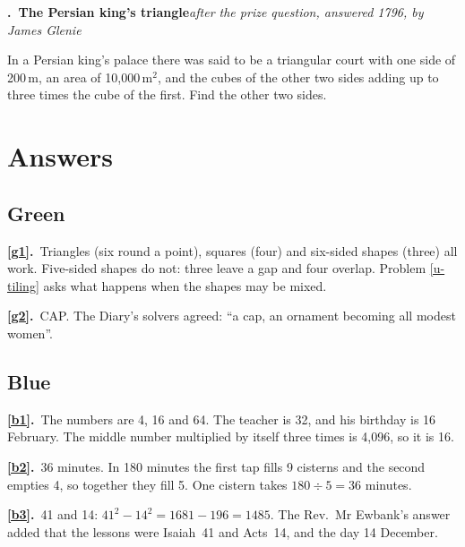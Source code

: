 \documentclass[11pt,a4paper]{article}
\newcounter{prob}
\newcommand{\prob}[3]{\par\bigskip\refstepcounter{prob}\label{#1}%
  \noindent\textbf{\theprob.\ #2}\hfill{\small\textit{#3}}\par\nopagebreak\smallskip}
\newcommand{\ans}[2]{\par\smallskip\noindent\textbf{\ref{#1}.}\ #2}
\begin{document}
\prob{u-persian}{The Persian king's triangle}{after the prize question, answered 1796, by James Glenie}
In a Persian king's palace there was said to be a triangular court with one side of
200\,m, an area of 10,000\,m$^2$, and the cubes of the other two sides adding up to three
times the cube of the first. Find the other two sides.

\clearpage
\section*{Answers}

\subsection*{\color{bandgreen}Green}
\ans{g1}{Triangles (six round a point), squares (four) and six-sided shapes (three) all
work. Five-sided shapes do not: three leave a gap and four overlap. Problem
\ref{u-tiling} asks what happens when the shapes may be mixed.}
\ans{g2}{CAP. The Diary's solvers agreed: ``a cap, an ornament becoming all modest
women''.}

\subsection*{\color{bandblue}Blue}
\ans{b1}{The numbers are 4, 16 and 64. The teacher is 32, and his birthday is 16
February. The middle number multiplied by itself three times is 4,096, so it is 16.}
\ans{b2}{36 minutes. In 180 minutes the first tap fills 9 cisterns and the second
empties 4, so together they fill 5. One cistern takes $180 \div 5 = 36$ minutes.}
\ans{b3}{41 and 14: $41^2 - 14^2 = 1681 - 196 = 1485$. The Rev.~Mr Ewbank's answer added
that the lessons were Isaiah~41 and Acts~14, and the day 14 December.}
\end{document}
